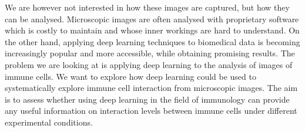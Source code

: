 We are however not interested in how these images are captured, but how they can be analysed. Microscopic images are often analysed with proprietary software which is costly to maintain and whose inner workings are hard to understand. On the other hand, applying deep learning techniques to biomedical data is becoming increasingly popular and more accessible, while obtaining promising results. The problem we are looking at is applying deep learning to the analysis of images of immune cells. We want to explore how deep learning could be used to systematically explore immune cell interaction from microscopic images. The aim is to assess whether using deep learning in the field of immunology can provide any useful information on interaction levels between immune cells under different experimental conditions. 